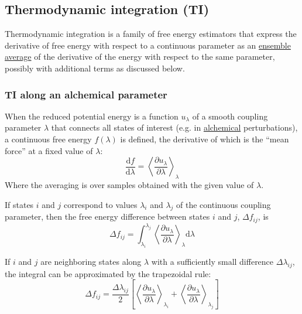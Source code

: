 \documentclass[9pt,review]{livecoms}
\begin{document}
\subsection{Thermodynamic integration (TI)}
\label{sec:fe_estimators:TI}

Thermodynamic integration is a family of free energy estimators that express the derivative of free energy with respect to a continuous parameter as an \hyperlink{ref:ensemble_average} {ensemble average} of the derivative of the energy with respect to the same parameter, possibly with additional terms as discussed below.

\subsubsection{TI along an alchemical parameter}

When the reduced potential energy is a function $u_\lambda$ of a smooth coupling parameter $\lambda$ that connects all states of interest (e.g. in \hyperlink{ref:Alchemical} {alchemical} perturbations), a continuous free energy $f(\lambda)$ is defined, the derivative of which is the ``mean force'' at a fixed value of $\lambda$:
\begin{equation}
\frac{\mathrm{d}f}{\mathrm{d}\lambda} =\left\langle \frac{\partial u_\lambda}{\partial \lambda} \right\rangle_\lambda
\label{eq:TI1}
\end{equation}
Where the averaging is over samples obtained with the given value of $\lambda$.

If states $i$ and $j$ correspond to values $\lambda_i$ and $\lambda_j$ of the continuous coupling parameter, then the free energy difference between states $i$ and $j$, $\Delta f_{ij}$, is
\begin{equation}
\Delta f_{ij} = \int_{\lambda_i}^{\lambda_j}  \left\langle \frac{\partial u_\lambda}{\partial \lambda} \right\rangle_\lambda \mathrm{d}\lambda
\label{eq:TI2}
\end{equation}

If $i$ and $j$ are neighboring states along $\lambda$ with a sufficiently small difference $\Delta \lambda_{ij}$, the integral can be approximated by the trapezoidal rule:
\begin{equation}
\Delta f_{ij} = \frac{\Delta \lambda_{ij}}{2}\left[\left\langle \frac{\partial u_\lambda}{\partial \lambda} \right\rangle_{\lambda_i} + \left\langle \frac{\partial u_\lambda}{\partial \lambda} \right\rangle_{\lambda_j}\right]
\label{eq:TI}
\end{equation}
\end{document}
